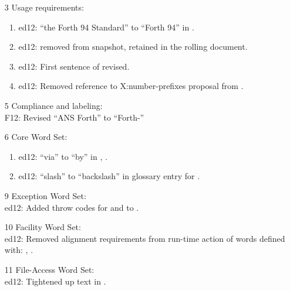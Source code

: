 \begin{itemize}
	\item[3] Usage requirements:					%
		\begin{enumerate}
		\item \textsf{ed12}: ``the Forth 94 Standard'' to ``Forth 94'' in .
		\item \textsf{ed12}:  removed from snapshot,
			retained in the rolling document.
		\item \textsf{ed12}: First sentence of  revised.
		\item \textsf{ed12}: Removed reference to \textsf{X:number-prefixes} proposal from .
		\end{enumerate}


	\item[5] Compliance and labeling:			%
		\\ \textsf{F12}: Revised ``ANS Forth'' to ``Forth-\snapshot''

	\item[6] Core Word Set:							%
		\begin{enumerate}
		\item \textsf{ed12}: ``via'' to ``by'' in , .
		\item \textsf{ed12}: ``slash'' to ``backslash'' in glossary entry for .
		\end{enumerate}

	\item[9] Exception Word Set:					%
		\\ \textsf{ed12}: Added throw codes for  and 
			to .

	\item[10] Facility Word Set:					%
		\\ \textsf{ed12}: Removed alignment requirements from run-time action of
			words defined with:
			,
			.

	\item[11] File-Access Word Set:				%
		\\ \textsf{ed12}: Tightened up text in .


\end{itemize}
